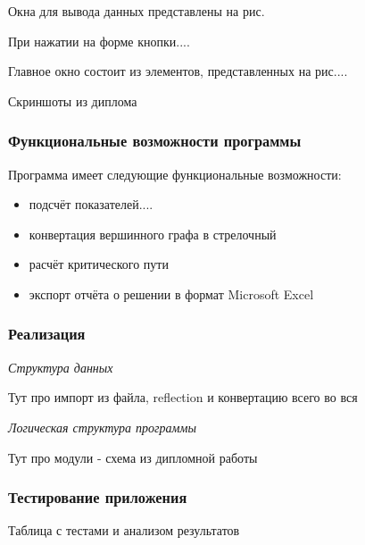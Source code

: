 Окна для вывода данных представлены на рис.

При нажатии на форме кнопки....

Главное окно состоит из элементов, представленных на рис....

Скриншоты из диплома

\subsubsection*{Функциональные возможности программы}
Программа имеет следующие функциональные возможности:
\begin{itemize}
  \item подсчёт показателей....
  \item конвертация вершинного графа в стрелочный
  \item расчёт критического пути
  \item экспорт отчёта о решении в формат Microsoft Excel
\end{itemize}

\subsubsection*{Реализация}

\textit{Структура данных}

Тут про импорт из файла, reflection и конвертацию всего во вся

\textit{Логическая структура программы}

Тут про модули - схема из дипломной работы

\subsubsection*{Тестирование приложения}

Таблица с тестами и анализом результатов
